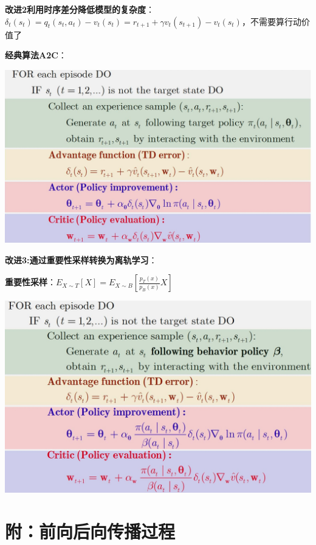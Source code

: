 	\textbf{改进2利用时序差分降低模型的复杂度}：$\delta_t\left(s_t\right)=q_t\left(s_t, a_t\right)-v_t\left(s_t\right)=r_{t+1}+\gamma v_t\left(s_{t+1}\right)-v_t\left(s_t\right)$，不需要算行动价值了
	
	\textbf{经典算法A2C}：
	
	\begin{figurehere}
		\centering
		\includegraphics[width=1\linewidth]{image15}
		\label{fig:image15}
	\end{figurehere}
	\textbf{改进3:通过重要性采样转换为离轨学习}：
	
	\textbf{重要性采样}：$E_{X\sim T}[X]=E_{X\sim B}\left[\frac{p_T(x)}{p_B(x)} X\right]$
	
	\begin{figurehere}
		\centering
		\includegraphics[width=1\linewidth]{image16}
		\label{fig:image16}
	\end{figurehere}
	
	\section*{附：前向后向传播过程}
		
